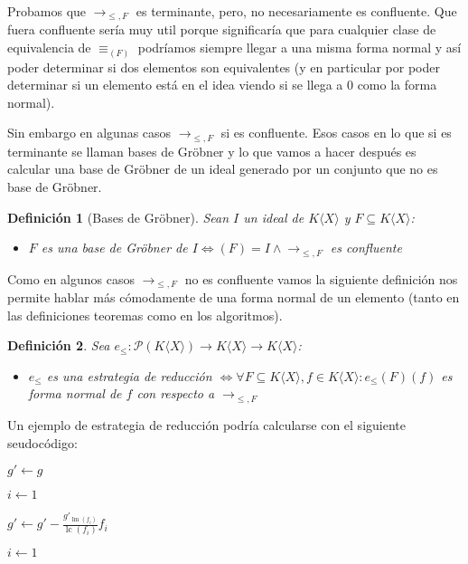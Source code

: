 \documentclass[12pt]{report}
\theoremstyle{customstyle}
\newtheorem{definition}{Definición}[chapter]
\theoremstyle{factstyle}
\DeclareMathOperator{\sop}{sop}
\DeclareMathOperator{\lm}{lm}
\DeclareMathOperator{\lc}{lc}
\begin{document}
Probamos que $→_{≤, F}$ es terminante, pero, no necesariamente es confluente. Que fuera confluente sería muy util porque significaría que para cualquier clase de equivalencia de $≡_{(F)}$ podríamos siempre llegar a una misma forma normal y así poder determinar si dos elementos son equivalentes (y en particular por poder determinar si un elemento está en el idea viendo si se llega a $0$ como la forma normal).

Sin embargo en algunas casos $→_{≤, F}$ si es confluente. Esos casos en lo que si es terminante se llaman bases de Gröbner y lo que vamos a hacer después es calcular una base de Gröbner de un ideal generado por un conjunto que no es base de Gröbner.

\begin{definition}[Bases de Gröbner]\label{def:base de Gröbner}
  Sean $I$ un ideal de $K⟨X⟩$ y $F ⊆ K⟨X⟩$:
  \begin{itemize}
    \item $F$ es una base de Gröbner de $I ⇔ (F) = I ∧ →_{≤, F}$ es confluente
  \end{itemize}
\end{definition}

Como en algunos casos $→_{≤, F}$ no es confluente vamos la siguiente definición nos permite hablar más cómodamente de una forma normal de un elemento (tanto en las definiciones teoremas como en los algoritmos).

\begin{definition}
  Sea $e_≤ : 𝒫(K⟨X⟩) → K⟨X⟩ → K⟨X⟩$:
  \begin{itemize}
    \item $e_≤$ es una estrategia de reducción $⇔ ∀F ⊆ K⟨X⟩, f ∈ K⟨X⟩ : e_≤(F)(f)$ es forma normal de $f$ con respecto a $→_{≤, F}$
  \end{itemize}
\end{definition}

Un ejemplo de estrategia de reducción podría calcularse con el siguiente seudocódigo:

\begin{algorithm}[H] %
  \caption{Ejemplo de estrategia de reducción}\label{alg:estrategia de reducción}
  $g' ← g$

  $i ← 1$

   {
     {
      \If{$f_i ∈ \sop(g')$} {
        $g' ← g' - \frac{g'_{\lm(f_i)}}{\lc(f_i)}f_i$

        $i ← 1$

        \Break
      }
    }
  }
\end{algorithm}
\end{document}
